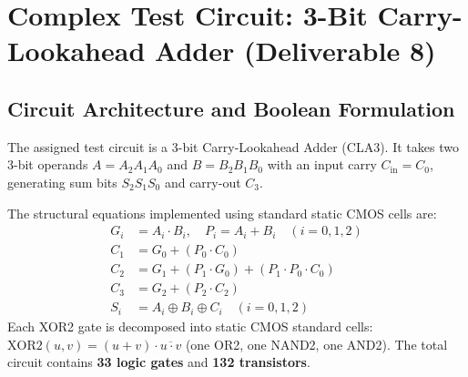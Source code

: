 \documentclass[11pt,a4paper]{article}
\begin{document}
\section{Complex Test Circuit: 3-Bit Carry-Lookahead Adder (Deliverable 8)}
\subsection{Circuit Architecture and Boolean Formulation}
The assigned test circuit is a 3-bit Carry-Lookahead Adder (CLA3). It takes two 3-bit operands $A = A_2 A_1 A_0$ and $B = B_2 B_1 B_0$ with an input carry $C_{\text{in}} = C_0$, generating sum bits $S_2 S_1 S_0$ and carry-out $C_3$. 

The structural equations implemented using standard static CMOS cells are:
\begin{align}
    G_i &= A_i \cdot B_i, \quad P_i = A_i + B_i \quad (i = 0, 1, 2) \\
    C_1 &= G_0 + (P_0 \cdot C_0) \\
    C_2 &= G_1 + (P_1 \cdot G_0) + (P_1 \cdot P_0 \cdot C_0) \\
    C_3 &= G_2 + (P_2 \cdot C_2) \\
    S_i &= A_i \oplus B_i \oplus C_i \quad (i = 0, 1, 2)
\end{align}
Each XOR2 gate is decomposed into static CMOS standard cells: $\text{XOR2}(u, v) = (u + v) \cdot \overline{u \cdot v}$ (one OR2, one NAND2, one AND2). The total circuit contains \textbf{33 logic gates} and \textbf{132 transistors}.
\end{document}
